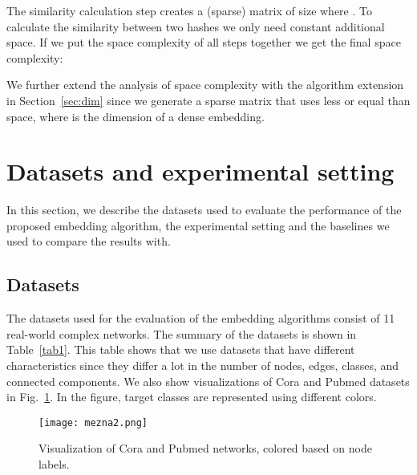 \documentclass[twoside,11pt]{article}
\begin{document}
The similarity calculation step creates a (sparse) matrix of size  where . To calculate the similarity between two hashes we only need constant additional space. If we put the space complexity of all steps together we get the final space complexity:


We further extend the analysis of space complexity with the algorithm extension in Section~\ref{sec:dim} since we generate a sparse matrix that uses less or equal than  space, where  is the dimension of a dense embedding.

\section{Datasets and experimental setting}
In this section, we describe the datasets used to evaluate the performance of the proposed embedding algorithm, the experimental setting and the baselines we used to compare the results with.

\subsection{Datasets}
The datasets used for the evaluation of the embedding algorithms consist of 11 real-world complex networks. The summary of the datasets is shown in Table~\ref{tab1}. This table shows that we use datasets that have different characteristics since they differ a lot in the number of nodes, edges, classes, and connected components. We also show visualizations of Cora and Pubmed datasets in Fig.~\ref{fig:networks}. In the figure, target classes are represented using different colors.

\begin{figure}[t!]
  \centering
  \texttt{[image: mezna2.png]}
  \caption{Visualization of Cora and Pubmed networks, colored based on node labels.}
  \label{fig:networks}
\end{figure}
\end{document}
